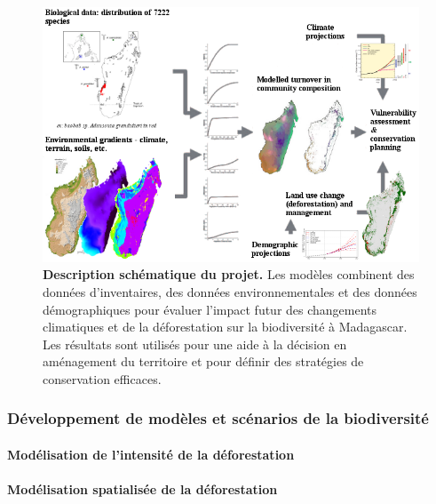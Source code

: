 \documentclass[12pt,]{article}
\let\oldparagraph\paragraph
\renewcommand{\paragraph}[1]{\oldparagraph{#1}\mbox{}}
\begin{document}
\begin{figure}[H]

{\centering \includegraphics[width=\textwidth]{figures/Scheme} 

}

\caption{\textbf{Description schématique du projet.} Les modèles
combinent des données d'inventaires, des données environnementales et
des données démographiques pour évaluer l'impact futur des changements
climatiques et de la déforestation sur la biodiversité à Madagascar. Les
résultats sont utilisés pour une aide à la décision en aménagement du
territoire et pour définir des stratégies de conservation efficaces.}\label{fig:schema}
\end{figure}

\hypertarget{developpement-de-modeles-et-scenarios-de-la-biodiversite}{%
\subsubsection{Développement de modèles et scénarios de la
biodiversité}\label{developpement-de-modeles-et-scenarios-de-la-biodiversite}}

\hypertarget{modelisation-de-lintensite-de-la-deforestation}{%
\paragraph{Modélisation de l'intensité de la
déforestation}\label{modelisation-de-lintensite-de-la-deforestation}}

\hypertarget{modelisation-spatialisee-de-la-deforestation}{%
\paragraph{Modélisation spatialisée de la
déforestation}\label{modelisation-spatialisee-de-la-deforestation}}
\end{document}
